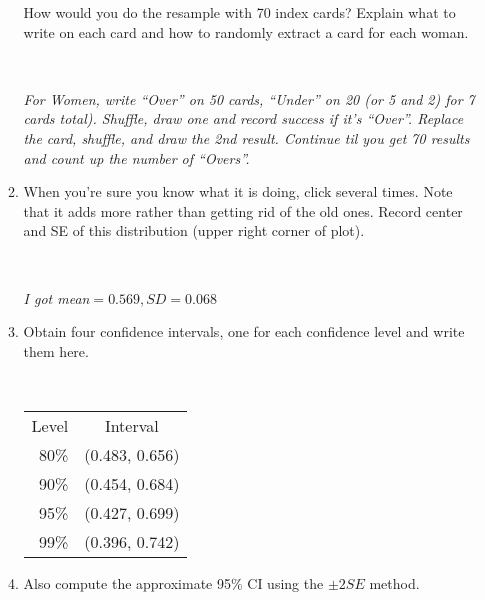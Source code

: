 \begin{enumerate}
\begin{enumerate}
\begin{key}
\end{key} 
         How would you do the resample with 70 index cards?  Explain
         what to write on each card and how to randomly extract a card
         for each woman.
\begin{students}
 \ \   \vspace*{1cm}\\
\end{students}
\begin{key}
  {\it For Women, write ``Over'' on 50 cards, ``Under'' on 20  (or 5
    and 2) for 7 cards total). 
    Shuffle, draw one and record success if it's ``Over''.  Replace
    the card, shuffle, and draw the 2nd result. Continue til you get
    70 results and count up the number of ``Overs''.}
\end{key} 
        \item When you're sure you know what it is doing, click
           several times. Note that it
          adds more rather than getting rid of the old ones.
          Record center and SE of this distribution (upper right
          corner of plot).
\begin{students}
 \ \   \vspace*{1cm}\\
\end{students}
\begin{key}
   {\it I got mean$ = 0.569, SD = 0.068$}
\end{key}

    \item Obtain four confidence intervals, one for each confidence
      level and write them here.
\begin{students}
 \ \   \vspace*{1cm}\\
\end{students}
\begin{key}
  \begin{tabular}{|r|c|}
    \hline
  Level & Interval \\
  80\%& (0.483, 0.656) \\
  90\% & (0.454, 0.684) \\
  95\% &(0.427, 0.699) \\
  99\% & (0.396, 0.742)
  \end{tabular}
\end{key}

\item Also compute the approximate 95\% CI using the $\pm 2 SE$ method.
   

\end{enumerate}
\end{enumerate}

